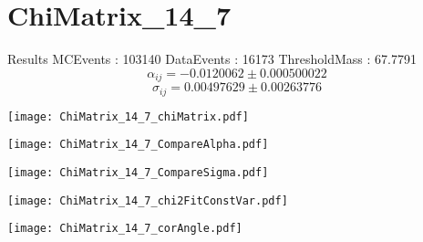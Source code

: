 \documentclass[a4paper,12pt]{article}
\begin{document}
\section{ChiMatrix\_14\_7}
\begin{minipage}{0.49\linewidth} Results \newline
MCEvents : 103140\newline
DataEvents : 16173 \newline
ThresholdMass : 67.7791\\
$$\alpha_{ij} = -0.0120062\pm 0.000500022$$
$$\sigma_{ij} = 0.00497629\pm 0.00263776$$
\end{minipage}\hfill
\begin{minipage}{0.49\linewidth} 
\texttt{[image: ChiMatrix\_14\_7\_chiMatrix.pdf]}\\
\end{minipage}
\hfill
\begin{minipage}{0.49\linewidth} 
\texttt{[image: ChiMatrix\_14\_7\_CompareAlpha.pdf]}\\
\end{minipage}
\hfill
\begin{minipage}{0.49\linewidth} 
\texttt{[image: ChiMatrix\_14\_7\_CompareSigma.pdf]}\\
\end{minipage}
\begin{minipage}{0.49\linewidth} 
\texttt{[image: ChiMatrix\_14\_7\_chi2FitConstVar.pdf]}\\
\end{minipage}
\hfill
\begin{minipage}{0.49\linewidth} 
\texttt{[image: ChiMatrix\_14\_7\_corAngle.pdf]}\\
\end{minipage}
\end{document}
